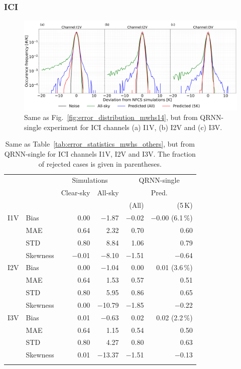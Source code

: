 \documentclass[amt, manuscript]{copernicus}
\begin{document}
\subsubsection{ICI}
%
\begin{figure}[t]
	\includegraphics[width=\textwidth]{Figures/fig08.pdf} 
	\caption{Same as Fig.~\ref{fig:error_distribution_mwhs14}, but from QRNN-single experiment for ICI channels (a) I1V, (b) I2V and (c) I3V. }
	\label{fig:error_distributions}	
\end{figure}
\begin{table}[t]
	\caption{ Same as Table~\ref{tab:error_statistics_mwhs_others}, but from QRNN-single for ICI channels I1V, I2V and I3V. The fraction of rejected cases is given in parentheses.}
	\label{tab:error_statistics_ici}
	\begin{tabular}{llrr|rr}
		\tophline
		&&\multicolumn{2}{c|}{Simulations}& \multicolumn{2}{c}{QRNN-single} \\
		\cline{3-6}
		&&Clear-sky &   All-sky &  \multicolumn{2}{c}{Pred.}  \\
		&&			   &			&	(All) & (5\,K) \\
		\middlehline
		
		I1V&  Bias      &  0.00 &$-$1.87 &$-$0.02 &$-$0.00 (6.1\,\%)  \\
		&MAE       		&  0.64 &  2.32 &  0.70 &  0.60   \\
		&STD       		&  0.80 &  8.84 &  1.06 &  0.79   \\
		&Skewness 		&$-$0.01 &$-$8.10 &$-$1.51 &$-$0.64  \\
		\middlehline
		I2V & Bias      & 0.00 & $-$1.04 &  0.00 &  0.01 (3.6\,\%)  \\
		&MAE       		& 0.64 &   1.53 &  0.57 &  0.51 \\
		&STD       		& 0.80 &   5.95 &  0.86 &  0.65 \\
		&Skewness 		& 0.00 &$-$10.79 &$-$1.85 &$-$0.22  \\
		\middlehline	
		I3V & Bias      & 0.01 & $-$0.63 &  0.02 &  0.02 (2.2\,\%)  \\
		&MAE       		& 0.64 &   1.15 &  0.54 &  0.50  \\
		&STD       		& 0.80 &   4.27 &  0.80 &  0.63  \\
		&Skewness 		& 0.01 &$-$13.37 &$-$1.51 &$-$0.13  \\
		\bottomhline
	\end{tabular}
	\belowtable{} %
\end{table}
\end{document}
